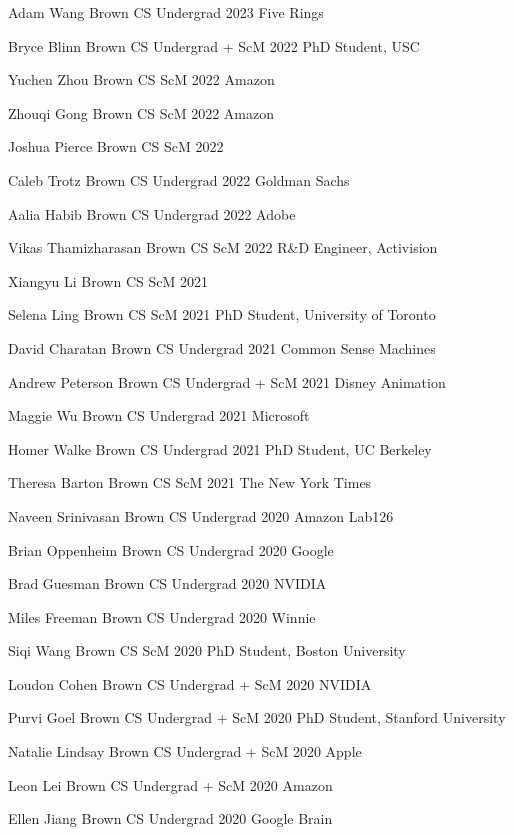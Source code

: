 \documentclass[line,margin]{res}
\begin{document}
\begin{resume}
\alumni
{Adam Wang}
{Brown CS Undergrad}
{2023}
{Five Rings}

\alumni
{Bryce Blinn}
{Brown CS Undergrad + ScM}
{2022}	
{PhD Student, USC}

\alumni
{Yuchen Zhou}
{Brown CS ScM}
{2022}
{Amazon}

\alumni
{Zhouqi Gong}
{Brown CS ScM}
{2022}
{Amazon}

\alumni
{Joshua Pierce}
{Brown CS ScM}
{2022}
{}

\alumni
{Caleb Trotz}
{Brown CS Undergrad}
{2022}
{Goldman Sachs}

\alumni
{Aalia Habib}
{Brown CS Undergrad}
{2022}
{Adobe}

\alumni
{Vikas Thamizharasan}
{Brown CS ScM}
{2022}
{R\&D Engineer, Activision}

\alumni
{Xiangyu Li}
{Brown CS ScM}
{2021}
{}

\alumni
{Selena Ling}
{Brown CS ScM}
{2021}
{PhD Student, University of Toronto}

\alumni
{David Charatan}
{Brown CS Undergrad}
{2021}
{Common Sense Machines}

\alumni
{Andrew Peterson}
{Brown CS Undergrad + ScM}
{2021}
{Disney Animation}

\alumni
{Maggie Wu}
{Brown CS Undergrad}
{2021}
{Microsoft}

\alumni
{Homer Walke}
{Brown CS Undergrad}
{2021}
{PhD Student, UC Berkeley}

\alumni
{Theresa Barton}
{Brown CS ScM}
{2021}
{The New York Times}

\alumni
{Naveen Srinivasan}
{Brown CS Undergrad}
{2020}
{Amazon Lab126}

\alumni
{Brian Oppenheim}
{Brown CS Undergrad}
{2020}
{Google}

\alumni
{Brad Guesman}
{Brown CS Undergrad}
{2020}
{NVIDIA}

\alumni
{Miles Freeman}
{Brown CS Undergrad}
{2020}
{Winnie}

\alumni
{Siqi Wang}
{Brown CS ScM}
{2020}
{PhD Student, Boston University}

\alumni
{Loudon Cohen}
{Brown CS Undergrad + ScM}
{2020}
{NVIDIA}

\alumni
{Purvi Goel}
{Brown CS Undergrad + ScM}
{2020}
{PhD Student, Stanford University}

\alumni
{Natalie Lindsay}
{Brown CS Undergrad + ScM}
{2020}
{Apple}

\alumni
{Leon Lei}
{Brown CS Undergrad + ScM}
{2020}
{Amazon}

\alumni
{Ellen Jiang}
{Brown CS Undergrad}
{2020}
{Google Brain}


\end{resume}
\end{document}
